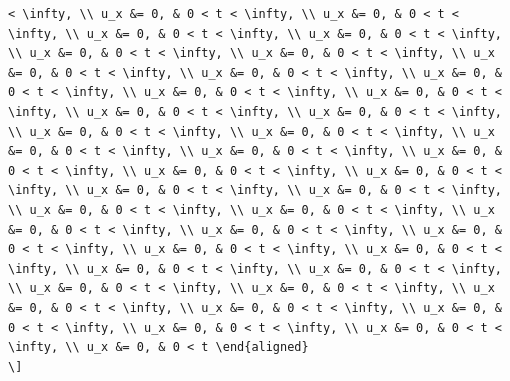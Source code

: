 \documentclass[
]{article}
\begin{document}
\begin{verbatim}
< \infty, \\ u_x &= 0, & 0 < t < \infty, \\ u_x &= 0, & 0 < t < \infty, \\ u_x &= 0, & 0 < t < \infty, \\ u_x &= 0, & 0 < t < \infty, \\ u_x &= 0, & 0 < t < \infty, \\ u_x &= 0, & 0 < t < \infty, \\ u_x &= 0, & 0 < t < \infty, \\ u_x &= 0, & 0 < t < \infty, \\ u_x &= 0, & 0 < t < \infty, \\ u_x &= 0, & 0 < t < \infty, \\ u_x &= 0, & 0 < t < \infty, \\ u_x &= 0, & 0 < t < \infty, \\ u_x &= 0, & 0 < t < \infty, \\ u_x &= 0, & 0 < t < \infty, \\ u_x &= 0, & 0 < t < \infty, \\ u_x &= 0, & 0 < t < \infty, \\ u_x &= 0, & 0 < t < \infty, \\ u_x &= 0, & 0 < t < \infty, \\ u_x &= 0, & 0 < t < \infty, \\ u_x &= 0, & 0 < t < \infty, \\ u_x &= 0, & 0 < t < \infty, \\ u_x &= 0, & 0 < t < \infty, \\ u_x &= 0, & 0 < t < \infty, \\ u_x &= 0, & 0 < t < \infty, \\ u_x &= 0, & 0 < t < \infty, \\ u_x &= 0, & 0 < t < \infty, \\ u_x &= 0, & 0 < t < \infty, \\ u_x &= 0, & 0 < t < \infty, \\ u_x &= 0, & 0 < t < \infty, \\ u_x &= 0, & 0 < t < \infty, \\ u_x &= 0, & 0 < t < \infty, \\ u_x &= 0, & 0 < t < \infty, \\ u_x &= 0, & 0 < t < \infty, \\ u_x &= 0, & 0 < t < \infty, \\ u_x &= 0, & 0 < t < \infty, \\ u_x &= 0, & 0 < t < \infty, \\ u_x &= 0, & 0 < t < \infty, \\ u_x &= 0, & 0 < t < \infty, \\ u_x &= 0, & 0 < t \end{aligned}
\]
\end{verbatim}
\end{document}
